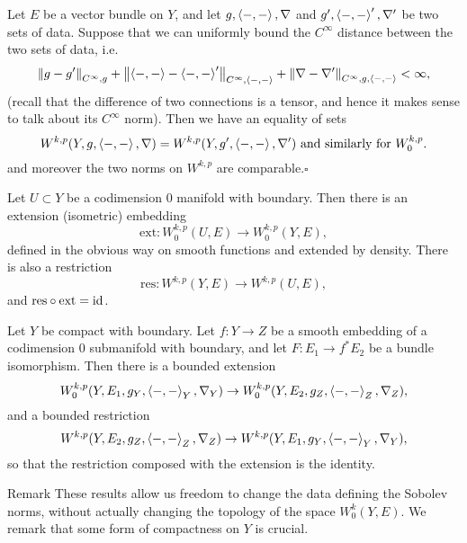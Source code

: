 \documentclass{amsart}
\begin{document}
\begin{thm}
  Let $E$ be a vector bundle on $Y$, and let $g,\left\langle-,-\right\rangle,\nabla$ and $g',\left\langle-,-\right\rangle',\nabla'$ be two sets of data. Suppose that we can uniformly bound the $C^{\infty}$ distance between the two sets of data, i.e.\
  \begin{equation*}
 \left\lVert g-g'\right\rVert_{C^{\infty},g}+\left\lVert\left\langle-,-\right\rangle-\left\langle-,-\right\rangle'\right\rVert_{C^{\infty},\left\langle-,-\right\rangle}+\left\lVert\nabla-\nabla'\right\rVert_{C^{\infty},g,\left\langle-,-\right\rangle}<\infty,
  \end{equation*}
  (recall that the difference of two connections is a tensor, and hence it makes sense to talk about its $C^{\infty}$ norm). Then we have an equality of sets
  \begin{equation*}
    W^{k,p}(Y,g,\left\langle-,-\right\rangle,\nabla)=W^{k,p}(Y,g',\left\langle-,-\right\rangle,\nabla')\text{ and similarly for $W^{k,p}_{0}$}.  \end{equation*}
  and moreover the two norms on $W^{k,p}$ are comparable.\hfill$\square$
\end{thm}
\begin{thm}
  Let $U\subset Y$ be a codimension $0$ manifold with boundary. Then there is an extension (isometric) embedding
  \begin{equation*}
    \text{ext}:W^{k,p}_{0}(U,E)\to W^{k,p}_{0}(Y,E),
  \end{equation*}
  defined in the obvious way on smooth functions and extended by density. There is also a restriction
  \begin{equation*}
    \text{res}:W^{k,p}(Y,E)\to W^{k,p}(U,E),
  \end{equation*}
  and $\text{res}\circ \text{ext}=\mathrm{id}$.
\end{thm}
\begin{cor}
  Let $Y$ be compact with boundary. Let $f:Y\to Z$ be a smooth
  embedding of a codimension $0$ submanifold with boundary, and let
  $F:E_{1}\to f^{*}E_{2}$ be a bundle isomorphism. Then there is a
  bounded extension
  \begin{equation*}
    W^{k,p}_{0}(Y,E_{1},g_{Y},\left\langle-,-\right\rangle_{Y},\nabla_{Y})\to W^{k,p}_{0}(Y,E_{2},g_{Z},\left\langle-,-\right\rangle_{Z},\nabla_{Z}),
  \end{equation*}
  and a bounded restriction
  \begin{equation*}
    W^{k,p}(Y,E_{2},g_{Z},\left\langle-,-\right\rangle_{Z},\nabla_{Z})\to W^{k,p}(Y,E_{1},g_{Y},\left\langle-,-\right\rangle_{Y},\nabla_{Y}),
  \end{equation*}
  so that the restriction composed with the extension is the identity. 
\end{cor}
\begin{clear}{Remark}
  These results allow us freedom to change the data defining the Sobolev norms, without actually changing the topology of the space $W^{k}_{0}(Y,E)$. We remark that some form of compactness on $Y$ is crucial. 
\end{clear}
\end{document}
